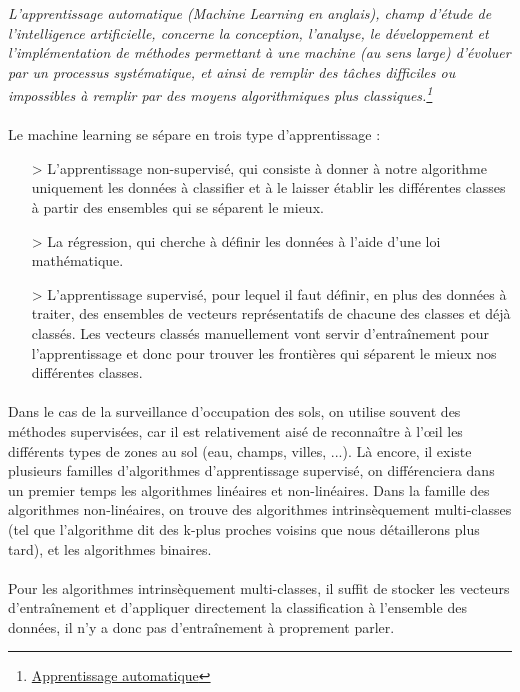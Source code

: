 \textit{L'apprentissage automatique (Machine Learning en anglais), champ d'étude de l'intelligence artificielle, concerne la conception, l'analyse, le développement et l'implémentation de méthodes permettant à une machine (au sens large) d'évoluer par un processus systématique, et ainsi de remplir des tâches difficiles ou impossibles à remplir par des moyens algorithmiques plus classiques.\footnote{\href{https://fr.wikipedia.org/wiki/Apprentissage_automatique}{Apprentissage automatique}}}

\paragraph{}
Le machine learning se sépare en trois type d'apprentissage :
\begin{itemize}
  \item[>] L'apprentissage non-supervisé, qui consiste à donner à notre algorithme uniquement les données à classifier et à le laisser établir les différentes classes à partir des ensembles qui se séparent le mieux.
  \item[>] La régression, qui cherche à définir les données à l'aide d'une loi mathématique.
  \item[>] L'apprentissage supervisé, pour lequel il faut définir, en plus des données à traiter, des ensembles de vecteurs représentatifs de chacune des classes et déjà classés. Les vecteurs classés manuellement vont servir d'entraînement pour l'apprentissage et donc pour trouver les frontières qui séparent le mieux nos différentes classes.
\end{itemize}

\paragraph{}
Dans le cas de la surveillance d'occupation des sols, on utilise souvent des méthodes supervisées, car il est relativement aisé de reconnaître à l'œil les différents types de zones au sol (eau, champs, villes, ...). Là encore, il existe plusieurs familles d'algorithmes d'apprentissage supervisé, on différenciera dans un premier temps les algorithmes linéaires et non-linéaires. Dans la famille des algorithmes non-linéaires, on trouve des algorithmes intrinsèquement multi-classes (tel que l'algorithme dit des k-plus proches voisins que nous détaillerons plus tard), et les algorithmes binaires.
\paragraph{}
Pour les algorithmes intrinsèquement multi-classes, il suffit de stocker les vecteurs d'entraînement et d'appliquer directement la classification à l'ensemble des données, il n'y a donc pas d'entraînement à proprement parler.
